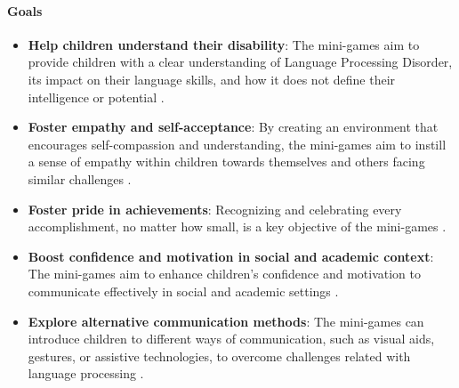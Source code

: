 \paragraph{Goals}
\begin{itemize}
    \item \textbf{Help children understand their disability}: The mini-games aim to provide children with a clear understanding of Language Processing Disorder, its impact on their language skills, and how it does not define their intelligence or potential \cite{vanderbilt}.
    \item \textbf{Foster empathy and self-acceptance}: By creating an environment that encourages self-compassion and understanding, the mini-games aim to instill a sense of empathy within children towards themselves and others facing similar challenges \cite{vanderbilt}.
    \item \textbf{Foster pride in achievements}: Recognizing and celebrating every accomplishment, no matter how small, is a key objective of the mini-games \cite{additude}.
    \item \textbf{Boost confidence and motivation in social and academic context}: The mini-games aim to enhance children's confidence and motivation to communicate effectively in social and academic settings \cite{greatspeech}.
    \item \textbf{Explore alternative communication methods}: The mini-games can introduce children to different ways of communication, such as visual aids, gestures, or assistive technologies, to overcome challenges related with language processing \cite{gow}.
\end{itemize}

